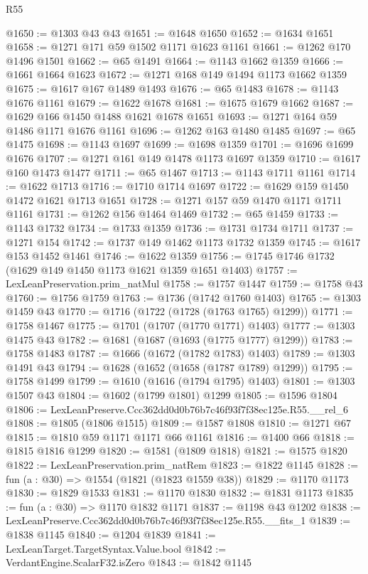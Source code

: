 \begin{lexlean}{R55}
\begin{coremodule}
@1650 := @1303 @43 @43
@1651 := @1648 @1650
@1652 := @1634 @1651
@1658 := @1271 @171 @59 @1502 @1171 @1623 @1161
@1661 := @1262 @170 @1496 @1501
@1662 := @65 @1491
@1664 := @1143 @1662 @1359
@1666 := @1661 @1664 @1623
@1672 := @1271 @168 @149 @1494 @1173 @1662 @1359
@1675 := @1617 @167 @1489 @1493
@1676 := @65 @1483
@1678 := @1143 @1676 @1161
@1679 := @1622 @1678
@1681 := @1675 @1679 @1662
@1687 := @1629 @166 @1450 @1488 @1621 @1678 @1651
@1693 := @1271 @164 @59 @1486 @1171 @1676 @1161
@1696 := @1262 @163 @1480 @1485
@1697 := @65 @1475
@1698 := @1143 @1697
@1699 := @1698 @1359
@1701 := @1696 @1699 @1676
@1707 := @1271 @161 @149 @1478 @1173 @1697 @1359
@1710 := @1617 @160 @1473 @1477
@1711 := @65 @1467
@1713 := @1143 @1711 @1161
@1714 := @1622 @1713
@1716 := @1710 @1714 @1697
@1722 := @1629 @159 @1450 @1472 @1621 @1713 @1651
@1728 := @1271 @157 @59 @1470 @1171 @1711 @1161
@1731 := @1262 @156 @1464 @1469
@1732 := @65 @1459
@1733 := @1143 @1732
@1734 := @1733 @1359
@1736 := @1731 @1734 @1711
@1737 := @1271 @154
@1742 := @1737 @149 @1462 @1173 @1732 @1359
@1745 := @1617 @153 @1452 @1461
@1746 := @1622 @1359
@1756 := @1745 @1746 @1732 (@1629 @149 @1450 @1173 @1621 @1359 @1651 @1403)
@1757 := LexLeanPreservation.prim_natMul
@1758 := @1757 @1447
@1759 := @1758 @43
@1760 := @1756 @1759
@1763 := @1736 (@1742 @1760 @1403)
@1765 := @1303 @1459 @43
@1770 := @1716 (@1722 (@1728 (@1763 @1765) @1299))
@1771 := @1758 @1467
@1775 := @1701 (@1707 (@1770 @1771) @1403)
@1777 := @1303 @1475 @43
@1782 := @1681 (@1687 (@1693 (@1775 @1777) @1299))
@1783 := @1758 @1483
@1787 := @1666 (@1672 (@1782 @1783) @1403)
@1789 := @1303 @1491 @43
@1794 := @1628 (@1652 (@1658 (@1787 @1789) @1299))
@1795 := @1758 @1499
@1799 := @1610 (@1616 (@1794 @1795) @1403)
@1801 := @1303 @1507 @43
@1804 := @1602 (@1799 @1801) @1299
@1805 := @1596 @1804
@1806 := LexLeanPreserve.Ccc362dd0d0b76b7c46f93f7f38ec125e.R55.__rel_6
@1808 := @1805 (@1806 @1515)
@1809 := @1587 @1808
@1810 := @1271 @67
@1815 := @1810 @59 @1171 @1171 @66 @1161
@1816 := @1400 @66
@1818 := @1815 @1816 @1299
@1820 := @1581 (@1809 @1818)
@1821 := @1575 @1820
@1822 := LexLeanPreservation.prim_natRem
@1823 := @1822 @1145
@1828 := fun (a : @30) => @1554 (@1821 (@1823 @1559 @38))
@1829 := @1170 @1173
@1830 := @1829 @1533
@1831 := @1170 @1830
@1832 := @1831 @1173
@1835 := fun (a : @30) => @1170 @1832 @1171
@1837 := @1198 @43 @1202
@1838 := LexLeanPreserve.Ccc362dd0d0b76b7c46f93f7f38ec125e.R55.__fits_1
@1839 := @1838 @1145
@1840 := @1204 @1839
@1841 := LexLeanTarget.TargetSyntax.Value.bool
@1842 := VerdantEngine.ScalarF32.isZero
@1843 := @1842 @1145

\end{coremodule}
\end{lexlean}

